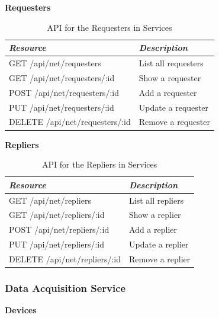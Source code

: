       \large{\textbf{Requesters}}

      \begin{table}[H]
        \centering
        \begin{tabular}{p{3in} p{3in}}
          \toprule
          \emph{Resource} & \emph{Description} \\ [0.5ex]
          \midrule
          GET /api/net/requesters & List all requesters \\
          GET /api/net/requesters/:id & Show a requester \\
          POST /api/net/requesters/:id & Add a requester \\
          PUT /api/net/requesters/:id & Update a requester \\
          DELETE /api/net/requesters/:id & Remove a requester \\
          \bottomrule
        \end{tabular}
        \caption{API for the Requesters in Services}\label{tab:rest-common-req}
      \end{table}

      \large{\textbf{Repliers}}

      \begin{table}[H]
        \centering
        \begin{tabular}{p{3in} p{3in}}
          \toprule
          \emph{Resource} & \emph{Description} \\ [0.5ex]
          \midrule
          GET /api/net/repliers & List all repliers \\
          GET /api/net/repliers/:id & Show a replier \\
          POST /api/net/repliers/:id & Add a replier \\
          PUT /api/net/repliers/:id & Update a replier \\
          DELETE /api/net/repliers/:id & Remove a replier \\
          \bottomrule
        \end{tabular}
        \caption{API for the Repliers in Services}\label{tab:rest-common-rep}
      \end{table}

    \subsubsection{Data Acquisition Service}\label{sec:rest-daq}

      \large{\textbf{Devices}}

